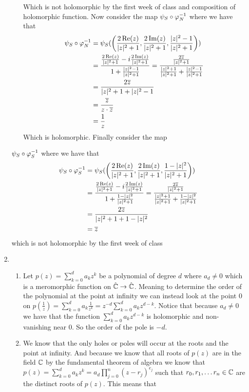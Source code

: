 \documentclass[12pt]{amsart}
\begin{document}
\begin{enumerate}
\begin{enumerate}
Which is not holomorphic by the first week of class and composition of holomorphic function. Now consider the map $\psi_S\circ\oldphi^{-1}_N$  where we have that
\begin{align*}
    \psi_S\circ\oldphi^{-1}_N &= \psi_S(\left(\frac{2\Real(z)}{|z|^2+1}, \frac{2\Imag(z)}{|z|^2+1}, \frac{|z|^2-1}{|z|^2+1}\right))\\
    &= \frac{\frac{2\Real(z)}{|z|^2+1}-i\frac{2\Imag(z)}{|z|^2+1}}{1+\frac{|z|^2-1}{|z|^2+1}}
    = \frac{\frac{2\overbar z}{|z|^2+1}}{\frac{|z|^2+1}{|z|^2+1}+\frac{|z|^2-1}{|z|^2+1}}\\
    &= \frac{2\overline z}{|z|^2+1+|z|^2-1}\\
    &= \frac{\overline z}{z\cdot \overbar{z}}\\
    &= \frac{1}{z}\\
\end{align*}
Which is holomorphic. Finally consider the map 
\end{enumerate}

$\psi_S\circ\oldphi^{-1}_S$  where we have that
\begin{align*}
    \psi_S\circ\oldphi^{-1}_S &= \psi_S(\left(\frac{2\Real(z)}{|z|^2+1}, \frac{2\Imag(z)}{|z|^2+1}, \frac{1-|z|^2}{|z|^2+1}\right))\\
    &= \frac{\frac{2\Real(z)}{|z|^2+1}-i\frac{2\Imag(z)}{|z|^2+1}}{1+\frac{1-|z|^2}{|z|^2+1}}
    = \frac{\frac{2\overbar z}{|z|^2+1}}{\frac{|z|^2+1}{|z|^2+1}+\frac{1-|z|^2}{|z|^2+1}}\\
    &= \frac{2\overline z}{|z|^2+1+1-|z|^2}\\
    &= {\overline z}\\
\end{align*}
which is not holomorphic by the first week of class

\item 
\begin{enumerate}
\item Let $p(z)=\sum_{k=0}^{d}a_kz^k$ be a polynomial of degree $d$ where $a_d\neq 0$ which is a meromorphic function on $\hat{\mathbb{C}}\rightarrow\hat{\mathbb{C}}$. Meaning to determine the order of the polynomial at the point at infinity we can instead look at the point $0$ on $p(\frac{1}{z})=\sum_{k=0}^{d}a_k\frac{1}{z^k}=z^{-d}\sum_{k=0}^{d}a_kz^{d-k}$. Notice that because $a_d\neq 0$ we have that the function $\sum_{k=0}^{d}a_kz^{d-k}$ is holomorphic and non-vanishing near $0$. So the order of the pole is $-d$.\\

\item We know that the only holes or poles will occur at the roots and the point at infinity. And because we know that all roots of $p(z)$ are in the field $\mathbb{C}$ by the fundamental theorem of algebra we know that $p(z)=\sum_{k=0}^{d}a_kz^k=a_d\prod_{j=0}^n(z-r_j)^{e_j}$ such that $r_0,r_1,\dots r_n\in \mathbb{C}$ are the distinct roots of $p(z)$. This means that 


\end{enumerate}
\end{enumerate}
\end{document}
